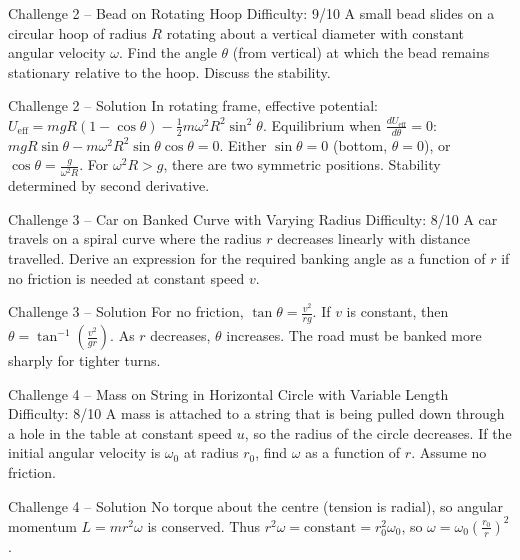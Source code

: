 \documentclass[11pt]{beamer}
\begin{document}
\begin{frame}[shrink=15]{Challenge 2 – Bead on Rotating Hoop \hfill Difficulty: 9/10}
A small bead slides on a circular hoop of radius $R$ rotating about a vertical diameter with constant angular velocity $\omega$. Find the angle $\theta$ (from vertical) at which the bead remains stationary relative to the hoop. Discuss the stability.
\end{frame}

\begin{frame}{Challenge 2 – Solution}
In rotating frame, effective potential: $U_{\text{eff}} = mgR(1-\cos\theta) - \frac12 m\omega^2 R^2 \sin^2\theta$.
Equilibrium when $\frac{dU_{\text{eff}}}{d\theta} = 0$: $mgR\sin\theta - m\omega^2 R^2 \sin\theta\cos\theta = 0$.
Either $\sin\theta = 0$ (bottom, $\theta=0$), or $\cos\theta = \frac{g}{\omega^2 R}$.
For $\omega^2 R > g$, there are two symmetric positions. Stability determined by second derivative.
\end{frame}

\begin{frame}[shrink=15]{Challenge 3 – Car on Banked Curve with Varying Radius \hfill Difficulty: 8/10}
A car travels on a spiral curve where the radius $r$ decreases linearly with distance travelled. Derive an expression for the required banking angle as a function of $r$ if no friction is needed at constant speed $v$.
\end{frame}

\begin{frame}{Challenge 3 – Solution}
For no friction, $\tan\theta = \frac{v^2}{rg}$. If $v$ is constant, then $\theta = \tan^{-1}\left(\frac{v^2}{g r}\right)$. As $r$ decreases, $\theta$ increases. The road must be banked more sharply for tighter turns.
\end{frame}

\begin{frame}[shrink=15]{Challenge 4 – Mass on String in Horizontal Circle with Variable Length \hfill Difficulty: 8/10}
A mass is attached to a string that is being pulled down through a hole in the table at constant speed $u$, so the radius of the circle decreases. If the initial angular velocity is $\omega_0$ at radius $r_0$, find $\omega$ as a function of $r$. Assume no friction.
\end{frame}

\begin{frame}{Challenge 4 – Solution}
No torque about the centre (tension is radial), so angular momentum $L = m r^2 \omega$ is conserved.
Thus $r^2 \omega = \text{constant} = r_0^2 \omega_0$, so $\omega = \omega_0 \left(\frac{r_0}{r}\right)^2$.
\end{frame}
\end{document}
